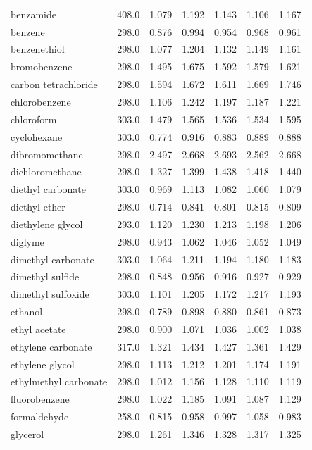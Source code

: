 \documentclass[aps,%
superscriptaddress,
 amsmath,amssymb,
floatfix,
twocolumn
]{revtex4-2}
\begin{document}
\begin{table}[b]
{\begin{tabular}{@{}laBaBaB@{}}
benzamide & 408.0 & 1.079 & 1.192  & 1.143 & 1.106 & 1.167 \\
benzene & 298.0 & 0.876 & 0.994  & 0.954 & 0.968 & 0.961 \\
benzenethiol & 298.0 & 1.077 & 1.204  & 1.132 & 1.149 & 1.161 \\
bromobenzene & 298.0 & 1.495 & 1.675  & 1.592 & 1.579 & 1.621 \\
carbon tetrachloride & 298.0 & 1.594 & 1.672  & 1.611 & 1.669 & 1.746 \\
chlorobenzene & 298.0 & 1.106 & 1.242  & 1.197 & 1.187 & 1.221 \\
chloroform & 303.0 & 1.479 & 1.565  & 1.536 & 1.534 & 1.595 \\
cyclohexane & 303.0 & 0.774 & 0.916  & 0.883 & 0.889 & 0.888 \\
dibromomethane & 298.0 & 2.497 & 2.668  & 2.693 & 2.562 & 2.668 \\
dichloromethane & 298.0 & 1.327 & 1.399  & 1.438 & 1.418 & 1.440 \\
diethyl carbonate & 303.0 & 0.969 & 1.113  & 1.082 & 1.060 & 1.079 \\
diethyl ether & 298.0 & 0.714 & 0.841  & 0.801 & 0.815 & 0.809 \\
diethylene glycol & 293.0 & 1.120 & 1.230  & 1.213 & 1.198 & 1.206 \\
diglyme & 298.0 & 0.943 & 1.062  & 1.046 & 1.052 & 1.049 \\
dimethyl carbonate & 303.0 & 1.064 & 1.211  & 1.194 & 1.180 & 1.183 \\
dimethyl sulfide & 298.0 & 0.848 & 0.956  & 0.916 & 0.927 & 0.929 \\
dimethyl sulfoxide & 303.0 & 1.101 & 1.205  & 1.172 & 1.217 & 1.193 \\
ethanol & 298.0 & 0.789 & 0.898  & 0.880 & 0.861 & 0.873 \\
ethyl acetate & 298.0 & 0.900 & 1.071  & 1.036 & 1.002 & 1.038 \\
ethylene carbonate & 317.0 & 1.321 & 1.434  & 1.427 & 1.361 & 1.429 \\
ethylene glycol & 298.0 & 1.113 & 1.212  & 1.201 & 1.174 & 1.191 \\
ethylmethyl carbonate & 298.0 & 1.012 & 1.156  & 1.128 & 1.110 & 1.119 \\
fluorobenzene & 298.0 & 1.022 & 1.185  & 1.091 & 1.087 & 1.129 \\
formaldehyde & 258.0 & 0.815 & 0.958  & 0.997 & 1.058 & 0.983 \\
glycerol & 298.0 & 1.261 & 1.346  & 1.328 & 1.317 & 1.325 \\

\end{tabular}}
\end{table}
\end{document}
